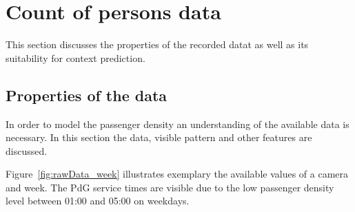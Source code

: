 \section{Count of persons data}
This section discusses the properties of the recorded datat as well as its suitability for context prediction.
\subsection{Properties of the data}
\label{sec:PassengerDensityData}

In order to model the passenger density an understanding of the available data is necessary. In this section the data, visible pattern and other features are discussed.

Figure~\ref{fig:rawData_week} illustrates exemplary the available values of a camera and week. The PdG service times are visible due to the low passenger density level between 01:00 and 05:00 on weekdays.


